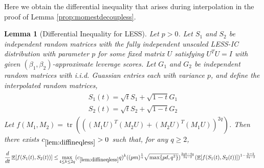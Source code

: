 \documentclass[11pt]{amsart}
\numberwithin{equation}{section}
\numberwithin{equation}{section}
\DeclareMathOperator{\E}{\mathbb{E}}
\DeclareMathOperator*{\tr}{tr}
\newtheorem{lemma}[theorem]{Lemma}
\theoremstyle{remark}
\theoremstyle{definition}
\begin{document}
Here we obtain the differential inequality that arises during interpolation in the proof of Lemma \ref{prop:momestdecoupless}. 
\begin{lemma}[Differential Inequality for LESS]\label{lem:diffineqless}
Let $p>0$. Let $S_1$ and $S_2$ be independent random matrices with the fully independent unscaled LESS-IC distribution with parameter $p$ for some fixed matrix $U$  satisfying $U^TU=I$ with given $(\beta_1, \beta_2)$-approximate leverage scores. Let $G_1$ and $G_2$ be independent random matrices with i.i.d. Guassian entries each with variance $p$, and define the interpolated random matrices,
\begin{align}
\begin{split} 
    S_1(t) = \sqrt{t}S_1 + \sqrt{1-t}G_1 \\
    S_2(t) = \sqrt{t}S_2 + \sqrt{1-t}G_2
\end{split}
\end{align}
Let $f(M_1,M_2)=\tr(((M_1U)^T(M_2U)+(M_2U)^T(M_1U))^{2q})$.
Then there exists $c_{\ref*{lem:diffineqless}} >0$ such that, for any $q\ge 2$,
\begin{align*}
    \frac{d}{dt} \E[f(S_1(t),S_2(t))] \le&  \max \limits_{4 \le k \le 2q} (c_{\ref*{lem:diffineqless}}q)^k ((pm)^\frac{1}{q}\sqrt{\max\{ pd,q^2\}})^{\frac{2qk-4q}{2q-2}}(\E[f(S_1(t),S_2(t))])^{1-\frac{k-2}{2q-2}}
\end{align*}
\end{lemma}
\end{document}
